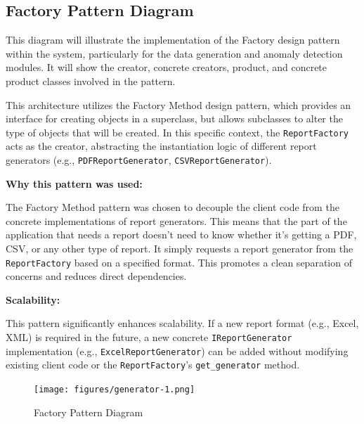 \subsection{Factory Pattern Diagram}
This diagram will illustrate the implementation of the Factory design pattern within the system, particularly for the data generation and anomaly detection modules. It will show the creator, concrete creators, product, and concrete product classes involved in the pattern.

This architecture utilizes the Factory Method design pattern, which provides an interface for creating objects in a superclass, but allows subclasses to alter the type of objects that will be created. In this specific context, the \texttt{ReportFactory} acts as the creator, abstracting the instantiation logic of different report generators (e.g., \texttt{PDFReportGenerator}, \texttt{CSVReportGenerator}).

\textbf{Why this pattern was used:}

The Factory Method pattern was chosen to decouple the client code from the concrete implementations of report generators. This means that the part of the application that needs a report doesn't need to know whether it's getting a PDF, CSV, or any other type of report. It simply requests a report generator from the \texttt{ReportFactory} based on a specified format. This promotes a clean separation of concerns and reduces direct dependencies.

\textbf{Scalability:}

This pattern significantly enhances scalability. If a new report format (e.g., Excel, XML) is required in the future, a new concrete \texttt{IReportGenerator} implementation (e.g., \texttt{ExcelReportGenerator}) can be added without modifying existing client code or the \texttt{ReportFactory}'s \texttt{get\_generator} method.

\begin{figure}[!htb]
    \centering
    \texttt{[image: figures/generator-1.png]}
    \caption{Factory Pattern Diagram}
    \label{fig:factory_pattern_diagram}
\end{figure}
 